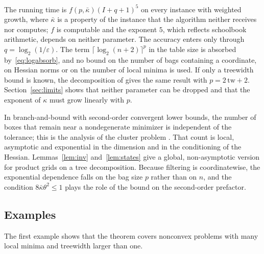 \begin{remark}
\label{rem:fpt}
The running time is $f(p,\bar\kappa)(I+q+1)^5$ on every instance with weighted
growth, where $\bar\kappa$ is a property of the instance that the algorithm
neither receives nor computes; $f$ is computable and the exponent $5$, which
reflects schoolbook arithmetic, depends on neither parameter. The accuracy
enters only through $q=\log_2(1/\varepsilon)$. The term
$\lceil\log_2(n+2)\rceil^p$ in the table size is absorbed
by~\eqref{eq:logabsorb}, and no bound on the number of bags containing a
coordinate, on Hessian norms or on the number of local minima is used. If only
a treewidth bound is known, the decomposition of \cite{Korhonen2021} gives the
same result with $p=2\,\mathrm{tw}+2$. Section~\ref{sec:limits} shows that
neither parameter can be dropped and that the exponent of $\kappa$ must grow
linearly with $p$.
\end{remark}

\begin{remark}\label{rem:cluster}
In branch-and-bound with second-order convergent lower bounds, the number of
boxes that remain near a nondegenerate minimizer is independent of the
tolerance; this is the analysis of the cluster problem
\cite{DuKearfott1994,Neumaier2004,WechsungSchaberBarton2014,KannanBarton2017}.
That count is local, asymptotic and exponential in the dimension and in the
conditioning of the Hessian. Lemmas~\ref{lem:inv} and~\ref{lem:states} give a
global, non-asymptotic version for product grids on a tree decomposition. Because
filtering is coordinatewise, the exponential dependence falls on the bag size
$p$ rather than on $n$, and the condition $8\bar\kappa\theta^2\le1$ plays the role
of the bound on the second-order prefactor.
\end{remark}

\subsection{Examples}
The first example shows that the theorem covers nonconvex problems with many
local minima and treewidth larger than one.

